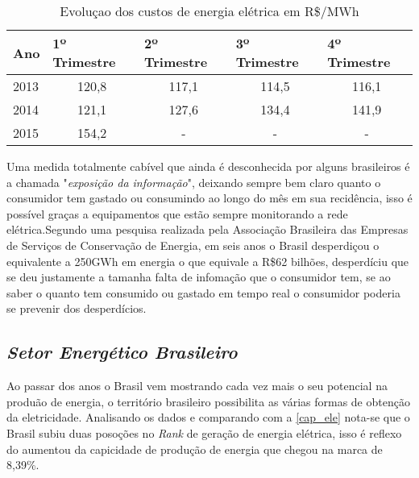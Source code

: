 \begin{table}[!ht]
	\centering
	\begin{tabular}{lcccc}
	\hline
	\textbf{Ano} & \multicolumn{1}{l}{\textbf{1º Trimestre}} & \multicolumn{1}{l}{\textbf{2º Trimestre}} & \multicolumn{1}{l}{\textbf{3º Trimestre}} & \multicolumn{1}{l}{\textbf{4º Trimestre}} \\ \hline
	\rowcolor[HTML]{DDDDDD} 
	2013         & 120,8                                     & 117,1                                     & 114,5                                     & 116,1                                     \\
	2014         & 121,1                                     & 127,6                                     & 134,4                                     & 141,9                                     \\
	\rowcolor[HTML]{DDDDDD} 
	2015         & 154,2                                     & -                                         & -                                         & -                                        
	\end{tabular}
	\caption{Evoluçao dos custos de energia elétrica em R\$/MWh}
	\label{evolucao-tarifa}
\end{table}

Uma medida totalmente cabível que ainda é desconhecida por alguns brasileiros é a chamada "\textit{exposição da informação}", deixando sempre bem claro 
quanto o consumidor tem gastado ou consumindo ao longo do mês em sua recidência, isso é possível graças a equipamentos que estão sempre monitorando
a rede elétrica.Segundo uma pesquisa realizada pela Associação Brasileira das Empresas de Serviços de Conservação de Energia, em seis anos o Brasil 
desperdiçou o equivalente a 250GWh em energia o que equivale a R\$62 bilhões, desperdíciu que se deu justamente a tamanha falta de infomação que 
o consumidor tem, se ao saber o quanto tem consumido ou gastado em tempo real o consumidor poderia se prevenir dos desperdícios. 

\subsection[\textit{Setor Energético Brasileiro}]{\textit{Setor Energético Brasileiro}}\label{seb}
Ao passar dos anos o Brasil vem mostrando cada vez mais o seu potencial na produão de energia, o território brasileiro possibilita as várias formas
de obtenção da eletricidade. Analisando os dados \cite[p.29]{epe-anuario-2015} e comparando com a \autoref{cap_ele} nota-se que o Brasil subiu duas
posoções no \textit{Rank} de geração de energia elétrica, isso é reflexo do aumentou da capicidade de produção de energia que chegou na marca de 8,39\%.

